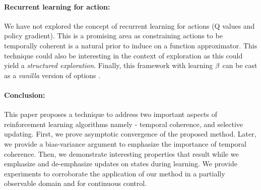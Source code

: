 \paragraph{Recurrent learning for action:} We have not explored the concept of recurrent learning for actions (Q values and policy gradient). This is a promising area as constraining actions to be temporally coherent is a natural prior to induce on a function approximator. This technique could also be interesting in the context of exploration as this could yield a \emph{structured exploration}. Finally, this framework with learning $\beta$ can be cast as a \emph{vanilla} version of options \cite{sutton1999between}. 


\paragraph{Conclusion:}This paper proposes a technique to address two important aspects of reinforcement learning algorithms namely - temporal coherence, and selective updating. First, we prove asymptotic convergence of the proposed method. Later, we provide a bias-variance argument to emphasize the importance of temporal coherence. Then, we demonstrate interesting properties that result while we emphasize and de-emphasize updates on states during learning. We provide experiments to corroborate the application of our method in a partially observable domain and for continuous control.





